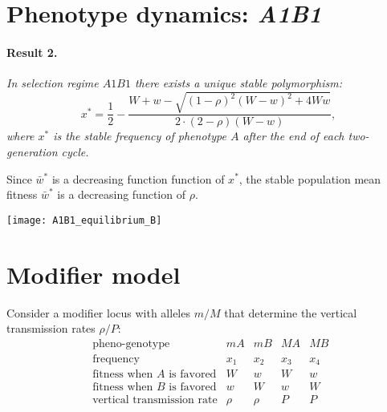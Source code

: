 \documentclass[a0,landscape]{a0poster}
\begin{document}
\begin{multicols}{4}
\columnbreak

\section*{Phenotype dynamics: \emph{A1B1}}

\paragraph*{Result 2.}\textit{In selection regime $A1B1$ there exists a unique stable polymorphism:
\begin{equation}
x^* =\frac{1}{2} -\frac{W+w-\sqrt{\left(1-\rho\right)^2\left(W-w\right)^2 +4Ww}}{2\cdot(2-\rho)(W-w)},
\end{equation}
where $x^*$ is the stable frequency of phenotype $A$ after the end of each two-generation cycle.
}

Since $\bar{w}^*$ is a decreasing function function of $x^*$, the stable population mean fitness $\bar{w}^*$ is a decreasing function of $\rho$.

\begin{center}\vspace{1cm}
\texttt{[image: A1B1\_equilibrium\_B]}
\end{center}\vspace{1cm}

\section*{Modifier model}

Consider a modifier locus with alleles $m/M$ that determine the vertical transmission rates $\rho/P$:
\begin{equation}
\begin{matrix}
 \text{ pheno-genotype}&mA&mB&MA&MB\\
 \text{ frequency}&x_1&x_2&x_3&x_4\\
 \text{ fitness when $A$ is favored}&W&w&W&w\\
 \text{ fitness when $B$ is favored}&w&W&w&W\\
 \text{ vertical transmission rate}&\rho&\rho&P&P\\
\end{matrix}
\end{equation}


\end{multicols}
\end{document}

